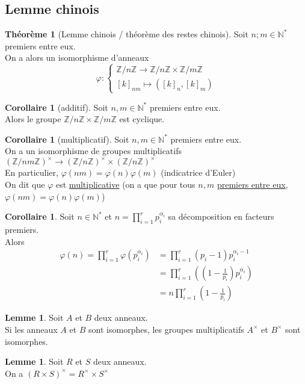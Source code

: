 \documentclass[10pt,a4paper]{article}
\theoremstyle{definition}
\newtheorem{theorem}[proposition]{Théorème}
\newtheorem{corollaire}[proposition]{Corollaire}
\newtheorem{lemme}[proposition]{Lemme}
\begin{document}
\subsection{Lemme chinois}
\begin{theorem}[Lemme chinois / théorème des restes chinois]
Soit $n; m \in \mathbb{N}^*$ premiers entre eux. \\
On a alors un isomorphisme d'anneaux
\[ \varphi: \begin{cases}
\mathbb{Z}/n\mathbb{Z} \to \mathbb{Z}/n\mathbb{Z} \times \mathbb{Z}/m\mathbb{Z} \\
[k]_{nm} \mapsto ([k]_n, [k]_m)
\end{cases}\]
\end{theorem}
\begin{corollaire}[additif]
Soit $n, m \in \mathbb{N}^*$ premiers entre eux. \\
Alors le groupe $\mathbb{Z}/n\mathbb{Z} \times \mathbb{Z}/m\mathbb{Z}$ est cyclique.
\end{corollaire}
\begin{corollaire}[multiplicatif]
Soit $n, m \in \mathbb{N}^*$ premiers entre eux. \\
On a un isomorphisme de groupes multiplicatifs $(\mathbb{Z}/nm\mathbb{Z})^\times \to (\mathbb{Z}/n\mathbb{Z})^\times \times (\mathbb{Z}/n\mathbb{Z})^\times$ \\
En particulier, $\varphi(nm) = \varphi(n) \varphi(m)$ (indicatrice d'Euler) \\
On dit que $\varphi$ est \uline{multiplicative} (on a que pour tous $n, m$ \uline{premiers entre eux}, $\varphi(nm) = \varphi(n) \varphi(m)$)
\end{corollaire}
\begin{corollaire}
Soit $n \in \mathbb{N}^*$ et $n = \prod\limits_{i = 1}^r p_i^{\alpha_i}$ sa décomposition en facteurs premiers. \\
Alors
\begin{align*}
\varphi(n) = \prod_{i = 1}^r \varphi(p_i^{\alpha_i}) &= \prod_{i = 1}^r(p_i - 1) p_i^{\alpha_i - 1} \\
&= \prod_{i = 1}^r \left( \left(1 - \frac{1}{p_i}\right) p_i^{\alpha_i} \right) \\
&= n \prod_{i = 1}^r \left( 1 - \frac{1}{p_i} \right)
\end{align*}
\end{corollaire}
\begin{lemme}
Soit $A$ et $B$ deux anneaux. \\
Si les anneaux $A$ et $B$ sont isomorphes, les groupes multiplicatifs $A^\times$ et $B^\times$ sont isomorphes.
\end{lemme}
\begin{lemme}
Soit $R$ et $S$ deux anneaux. \\
On a $(R \times S)^\times = R^\times \times S^\times$
\end{lemme}
\end{document}
